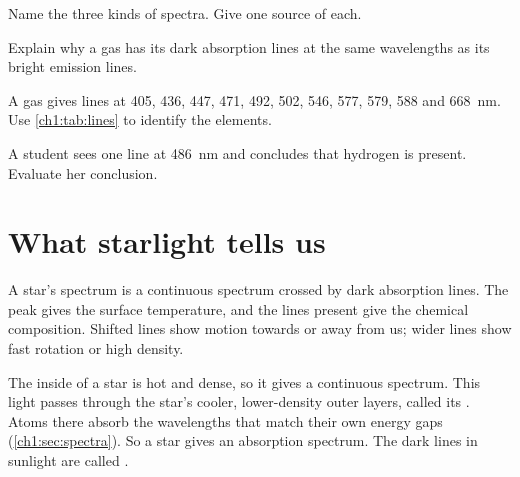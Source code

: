 \begin{quickcheck}
  \item Name the three kinds of spectra. Give one source of each.
  \item Explain why a gas has its dark absorption lines at the same wavelengths as its bright
        emission lines.
  \item A gas gives lines at 405, 436, 447, 471, 492, 502, 546, 577, 579, 588 and \qty{668}{nm}.
        Use \cref{ch1:tab:lines} to identify the elements.
  \item A student sees one line at \qty{486}{nm} and concludes that hydrogen is present.
        Evaluate her conclusion.
\end{quickcheck}

\section{What starlight tells us}\label{ch1:sec:stars}

\begin{bigidea}
A star's spectrum is a continuous spectrum crossed by dark absorption lines. The peak gives the
surface temperature, and the lines present give the chemical composition. Shifted lines show
motion towards or away from us; wider lines show fast rotation or high density.
\end{bigidea}

\begin{keywords}
\end{keywords}

The inside of a star is hot and dense, so it gives a continuous spectrum. This light passes
through the star's cooler, lower-density outer layers, called its . Atoms there
absorb the wavelengths that match their own energy gaps (\cref{ch1:sec:spectra}). So a star
gives an absorption spectrum. The dark lines in sunlight are called .

